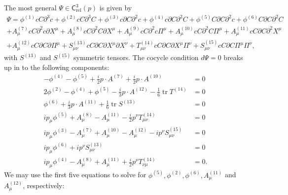 \documentclass[11pt,reqno,a4paper,final]{amsart}
\theoremstyle{plain}
\theoremstyle{definition}
\renewcommand{\d}{\partial}
\newcommand{\Crel}{\mathsf{C}_{\mathrm{rel}}} %
\newcommand{\tr}{\operatorname{tr}}
\newcommand{\1}{\mathbb{1}}
\numberwithin{equation}{section}
\begin{document}
The most general $\Psi \in \Crel^3(p)$ is given by
\begin{multline}
  \Psi = \phi^{(1)} c C \d^3 c + \phi^{(2)} c C \d^3 C + \phi^{(3)} c  \d C \d^2 c + \phi^{(4)} c \d C \d^2 C + \phi^{(5)} C \d C \d^2 c +  \phi^{(6)} C \d C \d^2 C\\
  + A^{(7)}_\mu c C \d^2 c \d X^\mu + A^{(8)}_\mu c C \d^2 C \d X^\mu +   A^{(9)}_\mu c C \d^2 c \Pi^\mu + A^{(10)}_\mu c C \d^2 C \Pi^\mu +   A^{(11)}_\mu c C \d C \d^2 X^\mu\\
  +   A^{(12)}_\mu c C \d C \d  \Pi^\mu + S^{(13)}_{\mu\nu} c C \d C \d X^\mu \d X^\nu + T^{(14)}_{\mu\nu} c C  \d C \d X^\mu \Pi^\nu + S^{(15)}_{\mu\nu} c C \d C \Pi^\mu \Pi^\nu,
\end{multline}
with $S^{(13)}$ and $S^{(15)}$ symmetric tensors.  The cocycle
condition $d\Psi = 0$ breaks up in to the following components:
\begin{align*}
  - \phi^{(4)} - \phi^{(5)} + \tfrac{i}2 p \cdot A^{(7)} + \tfrac{i}2 p \cdot A^{(10)}&= 0 & \tag{$c C \d^2 c \d^2 C$}\\
  2 \phi^{(2)} - \phi^{(4)} + \phi^{(5)} - \tfrac{i}3 p \cdot A^{(12)} - \tfrac16 \tr T^{(14)}&= 0 & \tag{$c C \d C \d^3 c$}\\
  \phi^{(6)} + \tfrac{i}3 p \cdot A^{(11)} + \tfrac16 \tr S^{(13)} &= 0 & \tag{$c C \d C \d^3 C$}\\
  i p_\mu \phi^{(5)} + A^{(8)}_\mu - A^{(11)}_\mu - \tfrac{i}2 p^\nu T^{(14)}_{\mu\nu}&= 0 & \tag{$c C \d C \d^2 c \d X^\mu$}\\
  i p_\mu \phi^{(3)} - A^{(7)}_\mu + A^{(10)}_\mu - A^{(12)}_\mu - i p^\nu S^{(15)}_{\mu\nu}&= 0 & \tag{$c C \d C \d^2c \Pi_\mu$}\\
  i p_\mu \phi^{(6)} + i p^\nu S^{(13)}_{\mu\nu}&= 0 & \tag{$c C \d C \d^2 C \d X^\mu$}\\
  i p_\mu \phi^{(4)} - A^{(8)}_\mu + A^{(11)}_\mu + \tfrac{i}2 p^\nu T^{(14)}_{\nu\mu} &= 0. & \tag{$c C \d C \d^2 C \Pi_\mu$}
\end{align*}
We may use the first five equations to solve for $\phi^{(5)}, \phi^{(2)}, \phi^{(6)}, A^{(11)}_\mu$ and $A^{(12)}_\mu$, respectively:
\end{document}
